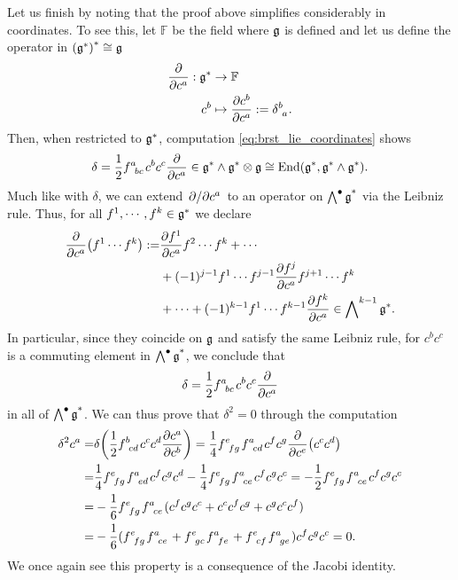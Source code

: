 Let us finish by noting that the proof above simplifies considerably in coordinates. To see this, let $\mathbb{F}$ be the field where $\mathfrak{g}$ is defined and let us define the operator in $\qty(\mathfrak{g}^*)^*\cong\mathfrak{g}$
\begin{equation}
\begin{aligned}
\pdv{c^a}:\g^*&\rightarrow\mathbb{F}\\
c^b&\mapsto\pdv{c^b}{c^a}:=\delta\indices{^b_a}.
\end{aligned}
\end{equation}
Then, when restricted to $\mathfrak{g}^*$, computation \eqref{eq:brst_lie_coordinates} shows
\begin{equation}
\delta=\frac{1}{2}f\indices{^a_{bc}}c^b c^c\pdv{c^a}\in\g^*\wedge\g^*\otimes\g\cong\End(\g^*,\g^*\wedge\g^*).
\end{equation}
Much like with $\delta$, we can extend $\pdv*{c^a}$ to an operator on $\operatorname{\bigwedge\nolimits^\bullet\mathfrak{g}^*}$ via the Leibniz rule. Thus, for all $f^1,\cdots,f^k\in\mathfrak{g}^*$ we declare
\begin{equation}\label{eq:leibniz_pdv_lie}
\begin{aligned}
\pdv{c^a}(f^1\cdots f^k):=&\pdv{f^1}{c^a}f^2\cdots f^k+\cdots\\
&+ (-1)^{j-1}f^1\cdots f^{j-1}\pdv{f^j}{c^a}f^{j+1}\cdots f^k\\
&+\cdots+(-1)^{k-1}f^1\cdots f^{k-1}\pdv{f^k}{c^a}\in\bigwedge\nolimits^{k-1}\mathfrak{g}^*.
\end{aligned}
\end{equation}
In particular, since they coincide on $\mathfrak{g}$ and satisfy the same Leibniz rule, for $c^bc^c$ is a commuting element in $\operatorname{\bigwedge\nolimits^\bullet\mathfrak{g}^*}$, we conclude that
\begin{equation}
\delta=\frac{1}{2}f\indices{^a_{bc}}c^b c^c\pdv{c^a}
\end{equation}
in all of $\operatorname{\bigwedge\nolimits^\bullet\mathfrak{g}^*}$. We can thus prove that $\delta^2=0$ through the computation
\begin{equation}\label{eq:differential_lie}
\begin{aligned}
\delta^2c^a=&\delta\qty(\frac{1}{2}f\indices{^b_{cd}}c^cc^d\pdv{c^a}{c^b})=\frac{1}{4}f\indices{^e_{fg}}f\indices{^a_{cd}}c^fc^g\pdv{c^e}(c^cc^d)\\
=&\frac{1}{4}f\indices{^e_{fg}}f\indices{^a_{ed}}c^fc^gc^d-\frac{1}{4}f\indices{^e_{fg}}f\indices{^a_{ce}}c^fc^gc^c=-\frac{1}{2}f\indices{^e_{fg}}f\indices{^a_{ce}}c^fc^gc^c\\
=&-\frac{1}{6}f\indices{^e_{fg}}f\indices{^a_{ce}}(c^fc^gc^c+c^cc^fc^g+c^gc^cc^f)\\
=&-\frac{1}{6}(f\indices{^e_{fg}}f\indices{^a_{ce}}+f\indices{^e_{gc}}f\indices{^a_{fe}}+f\indices{^e_{cf}}f\indices{^a_{ge}})c^fc^gc^c=0.
\end{aligned}
\end{equation}
We once again see this property is a consequence of the Jacobi identity.

